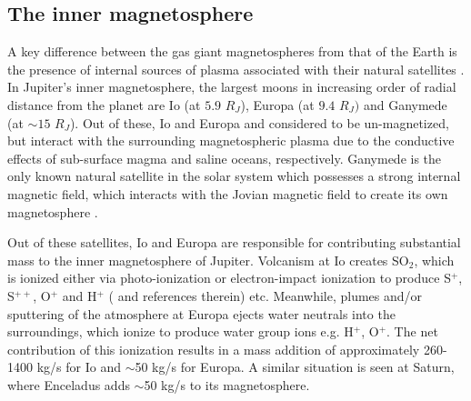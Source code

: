 \subsection{The inner magnetosphere}

A key difference between the gas giant magnetospheres from that of the Earth is the presence of internal sources of plasma associated with their natural satellites \cite{Bolton2015a}. In Jupiter's inner magnetosphere, the largest moons in increasing order of radial distance from the planet are Io (at $5.9$ $R_J$), Europa (at $9.4$ $R_J)$ and Ganymede (at $\sim15$ $R_J$). Out of these, Io and Europa and considered to be un-magnetized, but interact with the surrounding magnetospheric plasma due to the conductive effects of sub-surface magma and saline oceans, respectively. Ganymede is the only known natural satellite in the solar system which possesses a strong internal magnetic field, which interacts with the Jovian magnetic field to create its own magnetosphere \cite{Russell2005InteractionEnvironments,Jia2010MagneticSaturn,Khurana2011EvidenceInterior,Kivelson1996DiscoverySpacecraft,Kivelson2000GalileoEuropa}. 

Out of these satellites, Io and Europa are responsible for contributing substantial mass to the inner magnetosphere of Jupiter. Volcanism at Io creates SO$_2$, which is ionized either via photo-ionization or electron-impact ionization to produce S$^{+}$, S$^{++}$, O$^+$ and H$^+$ ( and references therein) etc. Meanwhile, plumes and/or sputtering of the atmosphere at Europa ejects water neutrals into the surroundings, which ionize to produce water group ions e.g. H$^+$, O$^+$. The net contribution of this ionization results in a mass addition of approximately 260-1400 kg/s for Io \cite{Bagenal2011b} and $\sim$50 kg/s for Europa. A similar situation is seen at Saturn, where Enceladus adds $\sim$50 kg/s to its magnetosphere. 

